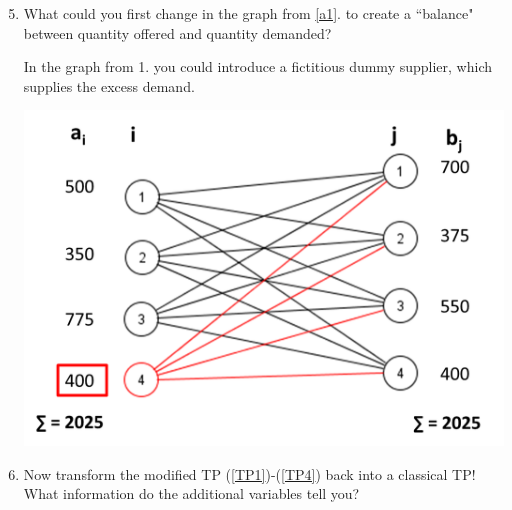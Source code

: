 \begin{enumerate}
\setcounter{enumi}{4}
	\item What could you first change in the graph from \ref{a1}. to create a ``balance" between quantity offered and quantity demanded?
	\begin{solution}
	
	In the graph from 1. you could introduce a fictitious dummy supplier, which supplies the excess demand.
	\uline{}
		\begin{center}
			\includegraphics[scale=0.5]{Uebungen/figures/bipartiter_Graph_A_1_4}\\
		\end{center}
	\end{solution}
	\item \label{a5} Now transform the modified TP (\ref{TP1})-(\ref{TP4}) back into a classical TP! What information do the additional variables tell you?
	\begin{solution}
	

\end{solution}
\end{enumerate}
